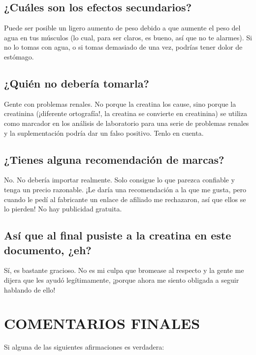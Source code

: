 \documentclass{article}
\begin{document}
\subsection{¿Cuáles son los efectos secundarios?}

Puede ser posible un ligero aumento de peso debido a que aumente el peso del agua en tus músculos (lo cual, para ser claros, es bueno, así que no te alarmes). Si no lo tomas con agua, o si tomas demasiado de una vez, podrías tener dolor de estómago.

\subsection{¿Quién no debería tomarla?}

Gente con problemas renales. No porque la creatina los cause, sino porque la creatinina (¡diferente ortografía!, la creatina se convierte en creatinina) se utiliza como marcador en los análisis de laboratorio para una serie de problemas renales y la suplementación podría dar un falso positivo. Tenlo en cuenta.

\subsection{¿Tienes alguna recomendación de marcas?}

No. No debería importar realmente. Solo consigue lo que parezca confiable y tenga un precio razonable. ¡Le daría una recomendación a la que me gusta, pero cuando le pedí al fabricante un enlace de afiliado me rechazaron, así que ellos se lo pierden! No hay publicidad gratuita.

\subsection{Así que al final pusiste a la creatina en este documento, ¿eh?}

Sí, es bastante gracioso. No es mi culpa que bromease al respecto y la gente me dijera que les ayudó legítimamente, ¡porque ahora me siento obligada a seguir hablando de ello!



\section{COMENTARIOS FINALES}

Si alguna de las siguientes afirmaciones es verdadera:
\end{document}
